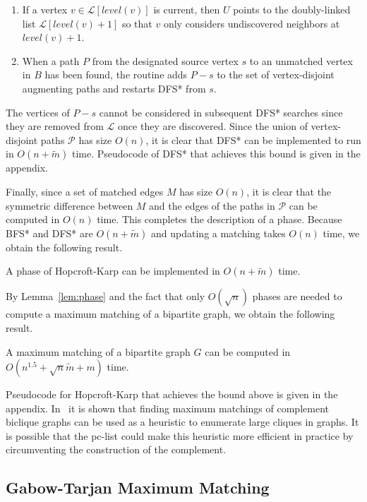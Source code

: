 \documentclass{llncs}
\begin{document}
\begin{enumerate}
\item If a vertex $v \in \mathcal{L}[level(v)]$ is current, then $U$ points to the doubly-linked list $\mathcal{L}[level(v)+1]$ so that $v$ only considers undiscovered neighbors at $level(v)+1$.
\item When a path $P$ from the designated source vertex $s$ to an unmatched vertex in $B$ has been found, the routine adds $P-s$ to the set of vertex-disjoint augmenting paths and restarts DFS* from $s$.
\end{enumerate}
The vertices of $P-s$ cannot be considered in subsequent DFS* searches since they are removed from $\mathcal{L}$ once they are discovered.   Since the union of vertex-disjoint paths $\mathcal{P}$ has size $O(n)$, it is clear that DFS* can be implemented to run in $O(n+\widetilde{m})$ time.   Pseudocode of DFS* that achieves this bound is given in the appendix.

Finally, since a set of matched edges $M$ has size $O(n)$, it is clear that the symmetric difference between $M$ and the edges of the paths in $\mathcal{P}$ can be computed in $O(n)$ time.  This completes the description of a phase.  Because BFS* and DFS* are $O(n+\widetilde{m})$ and updating a matching takes $O(n)$ time, we obtain the following result.

\begin{lemma}\label{lem:phase}
A phase of Hopcroft-Karp can be implemented in $O(n+\widetilde{m})$ time.
\end{lemma}

\noindent By Lemma~\ref{lem:phase} and the fact that only $O(\sqrt{n})$ phases are needed to compute a maximum matching of a bipartite graph,  we obtain the following result.
\begin{theorem}
A maximum matching of a bipartite graph $G$ can be computed in $O(n^{1.5}+\sqrt{n}\widetilde{m} +m)$ time.
\end{theorem}


\noindent Pseudocode for Hopcroft-Karp that achieves the bound above is given in the appendix.  In~\cite{BalasN93} it is shown that finding maximum matchings of complement biclique graphs can be used as a heuristic to enumerate large cliques in graphs.  It is possible that the pc-list could make this heuristic more efficient in practice by circumventing the construction of the complement.

\subsection{Gabow-Tarjan Maximum Matching}
\end{document}
